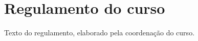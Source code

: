 \chapter{Regulamento do curso}\label{an:regulamento}

Texto do regulamento, elaborado pela coordenação do curso.
